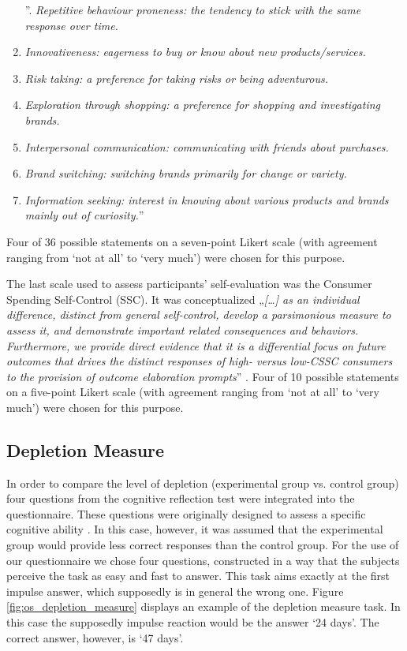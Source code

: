 \begin{enumerate}[label=\emph{\alph*}.]
\item [”\stepcounter{enumi}\emph{\alph{enumi}}.]\emph{Repetitive behaviour proneness: the tendency to stick with the same response over time. }
\item \emph{Innovativeness: eagerness to buy or know about new products/services. }
\item \emph{Risk taking: a preference for taking risks or being adventurous. }
\item \emph{Exploration through shopping: a preference for shopping and investigating brands. }
\item \emph{Interpersonal communication: communicating with friends about purchases. }
\item \emph{Brand switching: switching brands primarily for change or variety. }
\item \emph{Information seeking: interest in knowing about various products and brands mainly out of curiosity.}” \citep{raju1980optimum}
\end{enumerate}
Four of 36 possible statements on a seven-point Likert scale (with agreement ranging from ‘not at all’ to ‘very much’) were chosen for this purpose.\par
The last scale used to assess participants’ self-evaluation was the Consumer Spending Self-Control (SSC). It was conceptualized „\emph{[\ldots] as an individual difference, distinct from general self-control, develop a parsimonious measure to assess it, and demonstrate important related consequences and behaviors. Furthermore, we provide direct evidence that it is a differential focus on future outcomes that drives the distinct responses of high- versus low-CSSC consumers to the provision of outcome elaboration prompts}” \citep{haws2012consumer}. Four of 10 possible statements on a five-point Likert scale (with agreement ranging from ‘not at all’ to ‘very much’) were chosen for this purpose.\par

\FloatBarrier

\subsection{Depletion Measure}
In order to compare the level of depletion (experimental group vs. control group) four questions from the cognitive reflection test were integrated into the questionnaire. These questions were originally designed to assess a specific cognitive ability \citep{frederick2005cognitive}. In this case, however, it was assumed that the experimental group would provide less correct responses than the control group. For the use of our questionnaire we chose four questions, constructed in a way that the subjects perceive the task as easy and fast to answer. This task aims exactly at the first impulse answer, which supposedly is in general the wrong one.  Figure \ref{fig:os_depletion_measure} displays an example of the depletion measure task. In this case the supposedly impulse reaction would be the answer ‘24 days’. The correct answer, however, is ‘47 days’.  \par

